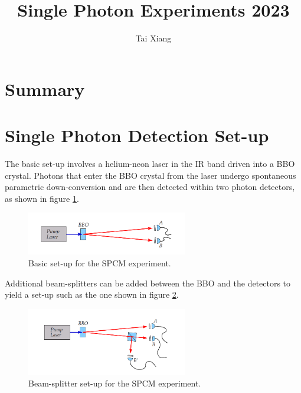 \documentclass[letterpaper, 11 pt]{book}
\begin{document}
\title{Single Photon Experiments 2023}
\author{Tai Xiang}
\maketitle
\pagestyle{empty}

\tableofcontents
\newpage

\section{Summary}
\newpage

\section{Single Photon Detection Set-up}

The basic set-up involves a helium-neon laser in the IR band driven into a BBO crystal. Photons that enter the BBO crystal from the laser
undergo spontaneous parametric down-conversion and are then detected within two photon detectors, as shown in figure \ref{fig:spcm_setup_basic}.
\begin{figure}[H]
    \centering
    \includegraphics[width = 7cm]{setup_basic.png}
    \caption{Basic set-up for the SPCM experiment.}
    \label{fig:spcm_setup_basic}
\end{figure}

Additional beam-splitters can be added between the BBO and the detectors to
yield a set-up such as the one shown in figure \ref{fig:spcm_setup_bs}.
\begin{figure}[H]
    \centering
    \includegraphics[width = 7cm]{setup.png}
    \caption{Beam-splitter set-up for the SPCM experiment.}
    \label{fig:spcm_setup_bs}
\end{figure}
\end{document}
